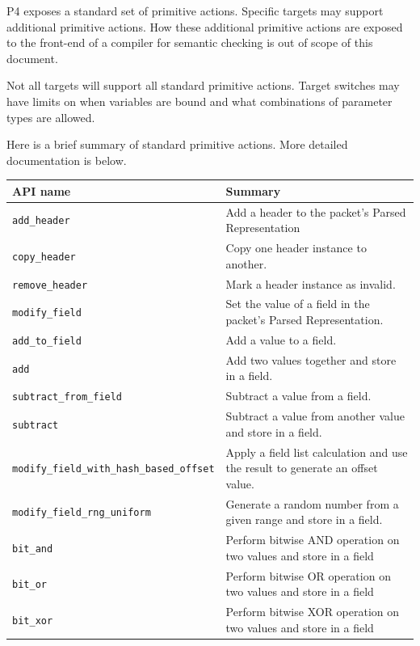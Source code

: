 \documentclass[12pt]{article}
\begin{document}

P4 exposes a standard set of primitive actions. Specific targets may support
additional primitive actions. How these additional primitive actions are exposed
to the front-end of a compiler for semantic checking is out of scope of this
document.

Not all targets will support all standard primitive actions. Target switches may
have limits on when variables are bound and what combinations of parameter types
are allowed.

Here is a brief summary of standard primitive actions. More detailed
documentation is below.

\begin{table}[H]
\begin{center}
\begin{tabular}{| l | p{} |} \hline
\textbf{API name} &
\textbf{Summary} \\ \hline
\texttt{add_header} &
Add a header to the packet's Parsed Representation \\ \hline
\texttt{copy_header} &
Copy one header instance to another. \\ \hline
\texttt{remove_header} &
Mark a header instance as invalid. \\ \hline
\texttt{modify_field} &
Set the value of a field in the packet's Parsed Representation. \\ \hline
\texttt{add_to_field} &
Add a value to a field. \\ \hline
\texttt{add} &
Add two values together and store in a field. \\ \hline
\texttt{subtract_from_field} &
Subtract a value from a field. \\ \hline
\texttt{subtract} &
Subtract a value from another value and store in a field. \\ \hline
\texttt{modify_field_with_hash_based_offset} &
Apply a field list calculation and use the result to generate an offset value. \\ \hline
\texttt{modify_field_rng_uniform} &
Generate a random number from a given range and store in a field. \\ \hline
\texttt{bit_and} &
Perform bitwise AND operation on two values and store in a field  \\ \hline
\texttt{bit_or} &
Perform bitwise OR operation on two values and store in a field  \\ \hline
\texttt{bit_xor} &
Perform bitwise XOR operation on two values and store in a field  \\ \hline
\end{tabular}
\end{center}
\end{table}
\end{document}
